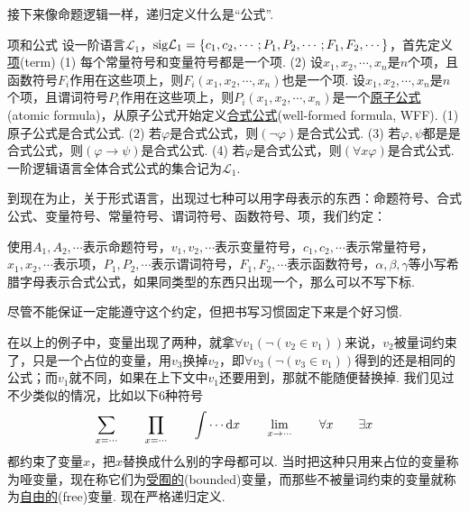 \documentclass[main.tex]{subfiles}
\begin{document}
接下来像命题逻辑一样，递归定义什么是“公式”.

\begin{definition}{项和公式}
    设一阶语言\(\mathcal{L}_1\)，\({\rm sig}\mathcal{L}_1 = \{ c_1, c_2, \cdots; P_1, P_2, \cdots; F_1, F_2, \cdots \}\)，首先定义\uline{项}(term) \newline
    (1) 每个常量符号和变量符号都是一个项. \newline
    (2) 设\(x_1, x_2, \cdots, x_n\)是\(n\)个项，且函数符号\(F_i\)作用在这些项上，则\(F_i(x_1, x_2, \cdots, x_n)\)也是一个项. \newline
    设\(x_1, x_2, \cdots, x_n\)是\(n\)个项，且谓词符号\(P_i\)作用在这些项上，则\(P_i(x_1, x_2, \cdots, x_n)\)是一个\uline{原子公式}(atomic formula)，从原子公式开始定义\uline{合式公式}(well-formed formula, WFF). \newline
    (1) 原子公式是合式公式. \newline
    (2) 若\(\varphi\)是合式公式，则\((\neg \varphi)\)是合式公式. \newline
    (3) 若\(\varphi, \psi\)都是是合式公式，则\((\varphi \to \psi)\)是合式公式. \newline
    (4) 若\(\varphi\)是合式公式，则\((\forall x \varphi)\)是合式公式.\newline
    一阶逻辑语言全体合式公式的集合记为\(\mathcal{L}_1\).
\end{definition}

到现在为止，关于形式语言，出现过七种可以用字母表示的东西：命题符号、合式公式、变量符号、常量符号、谓词符号、函数符号、项，我们约定：
\begin{reference}
    使用\(A_1, A_2, \cdots\)表示命题符号，\(v_1, v_2, \cdots\)表示变量符号，\(c_1, c_2, \cdots\)表示常量符号，\(x_1, x_2, \cdots\)表示项，\(P_1, P_2, \cdots\)表示谓词符号，\(F_1, F_2, \cdots\)表示函数符号，\(\alpha, \beta, \gamma\)等小写希腊字母表示合式公式，如果同类型的东西只出现一个，那么可以不写下标.
\end{reference}
尽管不能保证一定能遵守这个约定，但把书写习惯固定下来是个好习惯.

在以上的例子中，变量出现了两种，就拿\(\forall v_1 (\neg (v_2 \in v_1))\)来说，\(v_2\)被量词约束了，只是一个占位的变量，用\(v_3\)换掉\(v_2\)，即\(\forall v_3 (\neg (v_3 \in v_1))\)得到的还是相同的公式；而\(v_1\)就不同，如果在上下文中\(v_1\)还要用到，那就不能随便替换掉. 我们见过不少类似的情况，比如以下6种符号
\[\sum_{x=\cdots} \qquad \prod_{x=\cdots} \qquad \int \cdots {\rm d}x \qquad \lim_{x \to \cdots} \qquad \forall x \qquad \exists x\]
都约束了变量\(x\)，把\(x\)替换成什么别的字母都可以. 当时把这种只用来占位的变量称为哑变量，现在称它们为\uline{受囿的}(bounded)变量，而那些不被量词约束的变量就称为\uline{自由的}(free)变量. 现在严格递归定义.
\end{document}
